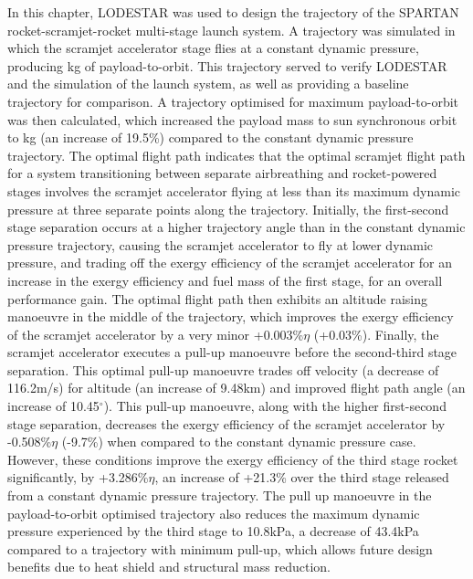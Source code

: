 In this chapter, LODESTAR was used to design the trajectory of the SPARTAN rocket-scramjet-rocket multi-stage launch system. 
A trajectory was simulated in which the scramjet accelerator stage flies at a constant dynamic pressure, producing \PayloadToOrbitConstqNoReturn kg of payload-to-orbit. This trajectory served to verify LODESTAR and the simulation of  the launch system, as well as providing a baseline trajectory for comparison. 
A trajectory optimised for maximum payload-to-orbit was then calculated, which increased the payload mass to sun synchronous orbit to \PayloadToOrbitStandardNoReturn kg (an increase of 19.5\%) compared to the constant dynamic pressure trajectory.
  The optimal flight path indicates that the optimal scramjet flight path for a system transitioning between separate airbreathing and rocket-powered stages involves the scramjet accelerator flying at less than its maximum dynamic pressure at three separate points along the trajectory. 
  Initially, the first-second stage separation occurs at a higher trajectory angle than in the constant dynamic pressure trajectory, causing the scramjet accelerator to fly at lower dynamic pressure, and trading off the exergy efficiency of the scramjet accelerator for an increase in the exergy efficiency and fuel mass of the first stage, for an overall performance gain. 
  The optimal flight path then exhibits an altitude raising manoeuvre in the middle of the trajectory, which improves the exergy efficiency of the scramjet accelerator by a very minor +0.003\%$\eta$ (+0.03\%). 
  Finally, the scramjet accelerator executes a pull-up manoeuvre before the second-third stage separation. This optimal pull-up manoeuvre trades off velocity (a decrease of 116.2m/s) for altitude (an increase of 9.48km) and improved flight path angle (an increase of 10.45$^\circ$). This pull-up manoeuvre, along with the higher first-second stage separation, decreases the exergy efficiency of the scramjet accelerator by -0.508\%$\eta$ (-9.7\%) when compared to the constant dynamic pressure case. 
  However, these conditions improve the exergy efficiency of the third stage rocket significantly, by +3.286\%$\eta$, an increase of +21.3\% over the third stage released from a constant dynamic pressure trajectory. 
 The pull up manoeuvre in the payload-to-orbit optimised trajectory also reduces the maximum dynamic pressure experienced by the third stage to 10.8kPa, a decrease of 43.4kPa compared to a trajectory with minimum pull-up, which allows future design benefits due to heat shield and structural mass reduction.  

